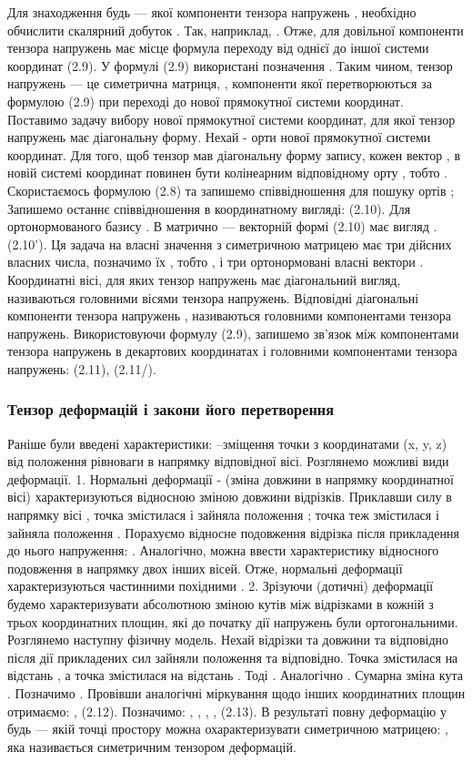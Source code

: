 Для знаходження будь --- якої компоненти тензора напружень  , необхідно обчислити скалярний добуток  . Так, наприклад,    .
Отже, для довільної компоненти тензора напружень має місце формула переходу від однієї до іншої системи координат 
 								(2.9). 
У формулі (2.9) використані позначення 	 . 
Таким чином, тензор напружень --- це симетрична матриця,  , компоненти якої перетворюються за формулою (2.9) при переході до нової прямокутної системи координат. 
Поставимо задачу вибору нової прямокутної системи координат, для якої тензор напружень має діагональну форму. Нехай   - орти нової прямокутної системи координат. Для того, щоб тензор   мав діагональну форму запису, кожен вектор  ,   в новій системі координат повинен бути колінеарним відповідному орту   ,  тобто  . 
Скористаємось формулою (2.8) та запишемо співвідношення для пошуку ортів  ;
Запишемо останнє співвідношення в координатному вигляді:
 			 (2.10).
Для ортонормованого базису 	 .
В матрично --- векторній формі (2.10) має вигляд
 . 										(2.10').
Ця задача на власні значення з симетричною матрицею має три дійсних власних числа, позначимо їх  , тобто  , і три ортонормовані власні вектори  .
Координатні вісі, для яких тензор напружень має діагональний вигляд, називаються головними вісями тензора напружень.
Відповідні діагональні компоненти тензора напружень  ,   називаються головними компонентами тензора напружень. 
Використовуючи формулу (2.9), запишемо зв'язок між компонентами тензора напружень в декартових координатах   і головними компонентами тензора напружень:
  							(2.11), 
 	 					(2.11/).

\subsubsection{Тензор деформацій і закони його перетворення}

Раніше були введені характеристики:   --зміщення точки з координатами (x, y, z) від положення рівноваги в напрямку відповідної вісі.
Розглянемо можливі види деформації.
1. Нормальні деформації - (зміна довжини в напрямку координатної вісі) характеризуються відносною зміною довжини відрізків.
Приклавши силу в напрямку вісі  , точка   змістилася і зайняла положення  ; точка   теж змістилася і зайняла положення   .
Порахуємо відносне подовження відрізка   після прикладення до нього напруження:
 .
Аналогічно, можна ввести характеристику відносного подовження в напрямку двох інших вісей. 
Отже, нормальні деформації характеризуються частинними похідними  .
2. Зрізуючи (дотичні) деформації  будемо характеризувати абсолютною зміною кутів між відрізками в кожній з трьох координатних площин, які до початку дії напружень були ортогональними. 
Розглянемо наступну фізичну модель. Нехай відрізки   та   довжини   та   відповідно після дії прикладених сил зайняли положення   та   відповідно. Точка   змістилася на відстань  , а точка   змістилася на відстань  .
Тоді    .
Аналогічно   .
Сумарна зміна кута  . Позначимо   .
Провівши аналогічні міркування щодо інших координатних площин отримаємо: 
 ,	 				(2.12).
Позначимо:  , , , ,			(2.13).
В результаті повну деформацію у будь --- якій точці простору можна охарактеризувати симетричною матрицею:  , яка називається симетричним тензором деформацій.

